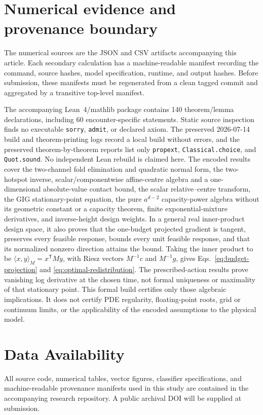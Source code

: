 \documentclass[aps,pre,reprint,amsmath,amssymb,longbibliography,floatfix]{revtex4-2}
\begin{document}
\section{Numerical evidence and provenance boundary}
\label{app:provenance}

The numerical sources are the JSON and CSV artifacts accompanying this
article. Each secondary calculation has a machine-readable manifest recording
the command, source hashes, model specification, runtime, and output hashes.
Before submission, these manifests must be regenerated from a clean tagged
commit and aggregated by a transitive top-level manifest.

The accompanying Lean~4/mathlib package contains 140 theorem/lemma
declarations, including 60 encounter-specific statements. Static source
inspection finds no executable \texttt{sorry}, \texttt{admit}, or declared
axiom. The preserved 2026-07-14 build and theorem-printing logs record a local
build without errors, and the preserved theorem-by-theorem reports list only
\texttt{propext}, \texttt{Classical.choice}, and \texttt{Quot.sound}.
No independent Lean rebuild is claimed here.
The encoded results cover the two-channel fold elimination and quadratic
normal form, the two-hotspot inverse, scalar/componentwise affine-centre
algebra and a one-dimensional absolute-value contact bound, the scalar
relative--centre transform, the GIG stationary-point equation, the pure
\(a^{d-2}\) capacity-power algebra without its geometric constant or a capacity
theorem, finite exponential-mixture derivatives, and inverse-height design
weights. In a general real inner-product design space, it also proves that the
one-budget projected gradient is tangent, preserves every feasible response,
bounds every unit feasible response, and that its normalized nonzero direction
attains the bound. Taking the inner product to be
\(\langle x,y\rangle_M=x^\mathsf TMy\), with Riesz vectors
\(M^{-1}c\) and \(M^{-1}g\), gives Eqs.~\eqref{eq:budget-projection} and
\eqref{eq:optimal-redistribution}. The prescribed-action results prove
vanishing log derivative at the chosen time, not formal uniqueness or
maximality of that stationary point.
This formal build certifies only
those algebraic implications. It does not certify PDE regularity,
floating-point roots, grid or continuum limits, or the applicability of the
encoded assumptions to the physical model.

\section*{Data Availability}

All source code, numerical tables, vector figures, classifier specifications,
and machine-readable provenance manifests used in this study are contained in
the accompanying research repository. A public archival DOI will be supplied
at submission.



\end{document}
